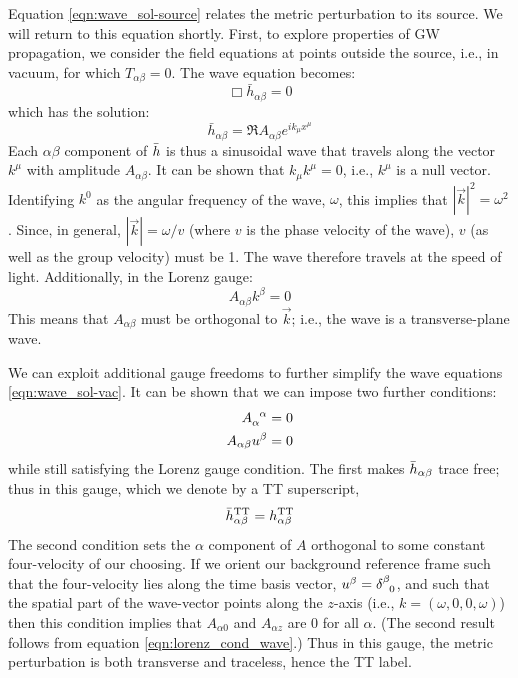Equation \ref{eqn:wave_sol-source} relates the metric perturbation to its source. We will return to this equation shortly. First, to explore properties of \ac{GW} propagation, we consider the field equations at points outside the source, i.e., in vacuum, for which $T_{\alpha\beta} = 0$. The wave equation becomes:
\begin{equation}
\Box\bar{h}_{\alpha\beta} = 0
\end{equation}
which has the solution:
\begin{equation}
\label{eqn:wave_sol-vac}
\bar{h}_{\alpha\beta} = \Re A_{\alpha\beta} e^{ik_\mu x^\mu}
\end{equation}
Each $\alpha\beta$ component of $\Bar{h}$ is thus a sinusoidal wave that travels along the vector $k^\mu$ with amplitude $A_{\alpha\beta}$. It can be shown \cite{Schutz} that $k_\mu k^\mu = 0$, i.e., $k^\mu$ is a null vector. Identifying $k^0$ as the angular frequency of the wave, $\omega$, this implies that  $|\vec{k}|^2 = \omega^2$. Since, in general, $|\vec{k}| = \omega/v$ (where $v$ is the phase velocity of the wave), $v$ (as well as the group velocity) must be 1. The wave therefore travels at the speed of light. Additionally, in the Lorenz gauge:
\begin{equation}
\label{eqn:lorenz_cond_wave}
A_{\alpha\beta}k^\beta = 0
\end{equation}
This means that $A_{\alpha\beta}$ must be orthogonal to $\vec{k}$; i.e., the wave is a transverse-plane wave.

We can exploit additional gauge freedoms to further simplify the wave equations \ref{eqn:wave_sol-vac}. It can be shown \cite{Schutz} that we can impose two further conditions:
\begin{align}
A\indices{_{\alpha}^{\alpha}} = 0 \\
A_{\alpha\beta}u^{\beta} = 0
\end{align}
while still satisfying the Lorenz gauge condition. The first makes $\Bar{h}_{\alpha\beta}$ trace free; thus in this gauge, which we denote by a TT superscript,
\begin{equation}
\Bar{h}^{\mathrm{TT}}_{\alpha\beta} = h^{\mathrm{TT}}_{\alpha\beta}
\end{equation}
The second condition sets the $\alpha$ component of $A$ orthogonal to some constant four-velocity of our choosing. If we orient our background reference frame such that the four-velocity lies along the time basis vector, $u^\beta = \delta\indices{^{\beta}_0}$, and such that the spatial part of the wave-vector points along the $z$-axis (i.e., $k = (\omega,0,0,\omega)$) then this condition implies that $A_{\alpha0}$ and $A_{\alpha z}$ are $0$ for all $\alpha$. (The second result follows from equation \ref{eqn:lorenz_cond_wave}.) Thus in this gauge, the metric perturbation is both transverse and traceless, hence the TT label.

